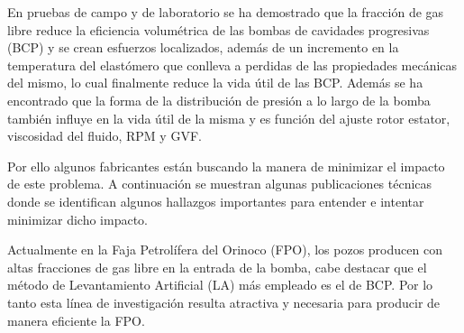 En pruebas de campo y de laboratorio se ha demostrado que la fracción de gas libre reduce la eficiencia volumétrica de las bombas de cavidades progresivas (BCP) y se crean esfuerzos localizados, además de un incremento en la temperatura del elastómero que conlleva a perdidas de las propiedades mecánicas del mismo, lo cual finalmente reduce la vida útil de las BCP. Además se ha encontrado que la forma de la distribución de presión a lo largo de la bomba también influye en la vida útil de la misma y es función del ajuste rotor estator, viscosidad del fluido, RPM y GVF.

Por ello algunos fabricantes están buscando la manera de minimizar el impacto de este problema. A continuación se muestran algunas publicaciones técnicas donde se identifican algunos hallazgos importantes para entender e intentar minimizar dicho impacto.

Actualmente en la Faja Petrolífera del Orinoco (FPO), los pozos producen con altas fracciones de gas libre en la entrada de la bomba, cabe destacar que el método de Levantamiento Artificial (LA) más empleado es el de BCP. Por lo tanto esta línea de investigación resulta atractiva y necesaria para producir de manera eficiente la FPO.